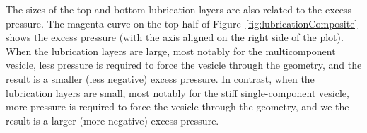 \documentclass[twoside,twocolumn,9pt]{article}
\newcommand{\subfigimg}[3][,]{%
  \setbox1=\hbox{\texttt{[image: \#3]}}%
  \leavevmode\rlap{\usebox1}%
  \rlap{\hspace*{0pt}\raisebox{\dimexpr\ht1-0\baselineskip}{\bf
  \normalsize #2}}%
  \phantom{\usebox1}%
}
\begin{document}

The sizes of the top and bottom lubrication layers are also related to
the excess pressure. The magenta curve on the top half of
Figure~\ref{fig:lubricationComposite} shows the excess pressure (with
the axis aligned on the right side of the plot). When the lubrication
layers are large, most notably for the multicomponent vesicle, less
pressure is required to force the vesicle through the geometry, and the
result is a smaller (less negative) excess pressure. In contrast, when
the lubrication layers are small, most notably for the stiff
single-component vesicle, more pressure is required to force the vesicle
through the geometry, and we the result is a larger (more negative)
excess pressure.
\end{document}
